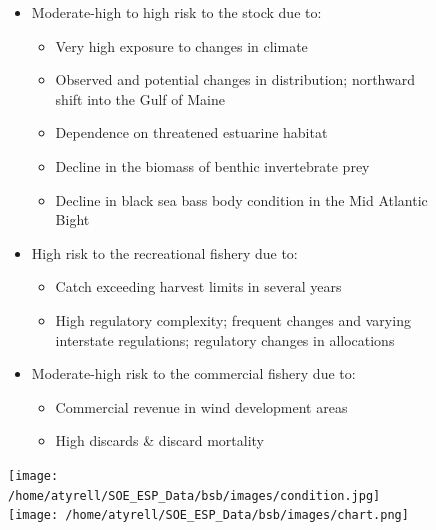 \documentclass[
  10pt,
  letterpaper,
  DIV=11,
  numbers=noendperiod]{scrartcl}
\providecommand{\tightlist}{%
  \setlength{\itemsep}{0pt}\setlength{\parskip}{0pt}}\usepackage{longtable,booktabs,array}
\begin{document}
\begin{figure}
\begin{minipage}[t]{0.57\linewidth}
{\begin{itemize}
\tightlist
\item
  Moderate-high to high risk to the stock due to:

  \begin{itemize}
  \tightlist
  \item
    Very high exposure to changes in climate
  \item
    Observed and potential changes in distribution; northward shift into
    the Gulf of Maine
  \item
    Dependence on threatened estuarine habitat
  \item
    Decline in the biomass of benthic invertebrate prey
  \item
    Decline in black sea bass body condition in the Mid Atlantic Bight
  \end{itemize}
\item
  High risk to the recreational fishery due to:

  \begin{itemize}
  \tightlist
  \item
    Catch exceeding harvest limits in several years
  \item
    High regulatory complexity; frequent changes and varying interstate
    regulations; regulatory changes in allocations
  \end{itemize}
\item
  Moderate-high risk to the commercial fishery due to:

  \begin{itemize}
  \tightlist
  \item
    Commercial revenue in wind development areas
  \item
    High discards \& discard mortality
  \end{itemize}
\end{itemize}

}

\end{minipage}%
%
\begin{minipage}[t]{0.03\linewidth}

{\centering 

\hfill

}

\end{minipage}%
%
\begin{minipage}[t]{0.40\linewidth}

{\centering 

\texttt{[image: /home/atyrell/SOE\_ESP\_Data/bsb/images/condition.jpg]}
\texttt{[image: /home/atyrell/SOE\_ESP\_Data/bsb/images/chart.png]}

}

\end{minipage}%

\end{figure}
\end{document}
